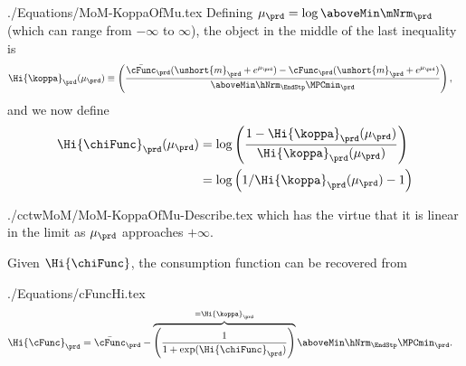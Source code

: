 \documentclass[\econtexRoot/SolvingMicroDSOPs]{subfiles}
\begin{document}
\begin{verbatimwrite}{./Equations/MoM-KoppaOfMu.tex}
  Defining $\mu_{\prd} =
  \log \aboveMin \mNrm_{\prd}$ (which can range from $-\infty$ to $\infty$), the object in the middle of the last inequality is
  \begin{equation}\begin{gathered}\begin{aligned}
        \Hi{\koppa}_{\prd}(\mu_{\prd})   & \equiv  \left(\frac{\bar{\cFunc}_{\prd}(\ushort{m}_{\prd}+e^{\mu_{\prd}})-\cFunc_{\prd}(\ushort{m}_{\prd}+e^{\mu_{\prd}})}{\aboveMin \hNrm_{\EndStp} \MPCmin_{\prd}}\right), \label{eq:koppa}
      \end{aligned}\end{gathered}\end{equation}
  and we now define
  \begin{equation}\begin{gathered}\begin{aligned}
        \Hi{\chiFunc}_{\prd}(\mu_{\prd})  & = \log \left(\frac{1-\Hi{\koppa}_{\prd}(\mu_{\prd})}{\Hi{\koppa}_{\prd}(\mu_{\prd})}\right)
        \\  & = \log \left(1/\Hi{\koppa}_{\prd}(\mu_{\prd})-1\right) \label{eq:chi}
      \end{aligned}\end{gathered}\end{equation}
\end{verbatimwrite}
\unskip
\begin{verbatimwrite}{./cctwMoM/MoM-KoppaOfMu-Describe.tex}
  which has the virtue that it is linear in the limit as $\mu_{\prd}$ approaches $+\infty$.

  Given $\Hi{\chiFunc}$, the consumption function can be recovered from
\end{verbatimwrite}
\unskip
\begin{verbatimwrite}{./Equations/cFuncHi.tex}
  \begin{equation}\begin{gathered}\begin{aligned}
        \Hi{\cFunc}_{\prd}  & = \bar{\cFunc}_{\prd}-\overbrace{\left(\frac{1}{1+\exp(\Hi{\chiFunc}_{\prd})}\right)}^{=\Hi{\koppa}_{\prd}} \aboveMin \hNrm_{\EndStp} \MPCmin_{\prd}. \label{eq:cFuncHi}
      \end{aligned}\end{gathered}\end{equation}
\end{verbatimwrite}
\unskip
\end{document}
